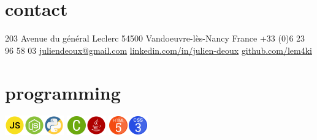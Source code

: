 \documentclass[]{lemaki-cv}
\begin{document}


	\begin{aside} %
		\section{contact}
		{\footnotesize 203 Avenue du général Leclerc
		54500 Vandoeuvre-lès-Nancy
		France}
		{\footnotesize +33 (0)6 23 96 58 03}
		\href{mailto:juliendeoux@gmail.com}{\footnotesize juliendeoux@gmail.com}
		\href{https://www.linkedin.com/in/julien-deoux}{\footnotesize linkedin.com/in/julien-deoux}
		\href{https://github.com/lem4ki}{\footnotesize github.com/lem4ki}
		\section{programming}
		\includegraphics[height=24pt]{figures/js}\includegraphics[height=24pt]{figures/nodejs}\includegraphics[height=24pt]{figures/python}
		\includegraphics[height=24pt]{figures/c}\includegraphics[height=24pt]{figures/java}
		\includegraphics[height=24pt]{figures/html}\includegraphics[height=24pt]{figures/css}

\end{aside}
\end{document}
